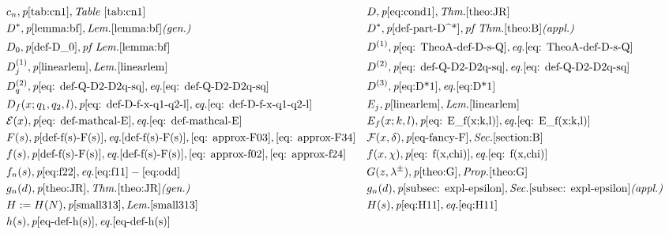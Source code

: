 \documentclass[12pt]{amsart}
\begin{document}
{\begin{align*}
    &c_n,\textit{p}\pageref{tab:cn1}, \textit{Table } \ref{tab:cn1}&
    &D,\textit{p}\pageref{eq:cond1},\textit{Thm.}\ref{theo:JR}\\
    &D^*,\textit{p}\pageref{lemma:bf},\textit{Lem.}\ref{lemma:bf} \textit{(gen.)}&
    &D^*,\textit{p}\pageref{def-part-D^*},\textit{pf Thm.}\ref{theo:B} \textit{(appl.)}\\
    &D_0,\textit{p}\pageref{def-D_0},\textit{pf Lem.}\ref{lemma:bf}&
    &D^{(1)},\textit{p}\pageref{eq: TheoA-def-D-s-Q},\textit{eq.}\eqref{eq: TheoA-def-D-s-Q}\\
    &D^{(1)}_j,\textit{p}\pageref{linearlem},\textit{Lem.}\ref{linearlem}&
    &D^{(2)},\textit{p}\pageref{eq: def-Q-D2-D2q-sq},\textit{eq.}\eqref{eq: def-Q-D2-D2q-sq}\\
    &D^{(2)}_q,\textit{p}\pageref{eq: def-Q-D2-D2q-sq},\textit{eq.}\eqref{eq: def-Q-D2-D2q-sq}&
    &D^{(3)},\textit{p}\pageref{eq:D*1},\textit{eq.}\eqref{eq:D*1}\\
    &D_{f}(x; q_1, q_2, l),\textit{p}\pageref{eq: def-D-f-x-q1-q2-l},\textit{eq.}\eqref{eq: def-D-f-x-q1-q2-l}&
    &E_j,\textit{p}\pageref{linearlem},\textit{Lem.}\ref{linearlem}\\
    &\mathcal{E}(x),\textit{p}\pageref{eq: def-mathcal-E},\textit{eq.}\eqref{eq: def-mathcal-E}&
    &E_f(x;k,l),\textit{p}\pageref{eq: E_f(x;k,l)},\textit{eq.}\eqref{eq: E_f(x;k,l)}\\
    &F(s),\textit{p}\pageref{def-f(s)-F(s)},\textit{eq.}\eqref{def-f(s)-F(s)},\eqref{eq: approx-F03},\eqref{eq: approx-F34}&
    &\mathcal{F}(x,\delta),\textit{p}\pageref{eq-fancy-F}, \textit{Sec.}\ref{section:B}\\
    &f(s),\textit{p}\pageref{def-f(s)-F(s)},\textit{eq.}\eqref{def-f(s)-F(s)},\eqref{eq: approx-f02},\eqref{eq: approx-f24}&
    &f(x,\chi),\textit{p}\pageref{eq: f(x,chi)},\textit{eq.}\eqref{eq: f(x,chi)}\\
    &f_n(s),\textit{p}\pageref{eq:f22},\textit{eq.}\eqref{eq:f11}-\eqref{eq:odd}&
    &G(z, \lambda^{\pm}),\textit{p}\pageref{theo:G},\textit{Prop.}\ref{theo:G}\\
    &g_n(d),\textit{p}\pageref{theo:JR},\textit{Thm.}\ref{theo:JR} \textit{(gen.)}& 
    &g_n(d),\textit{p}\pageref{subsec: expl-epsilon},\textit{Sec.} \ref{subsec: expl-epsilon} \textit{(appl.)}\\
    &H := H(N),\textit{p}\pageref{small313},\textit{Lem.}\ref{small313}&
    &H(s),\textit{p}\pageref{eq:H11},\textit{eq.}\eqref{eq:H11}\\
    &h(s),\textit{p}\pageref{eq-def-h(s)},\textit{eq.}\eqref{eq-def-h(s)}&

\end{align*}}
\end{document}
